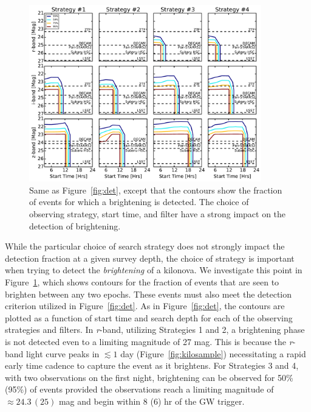 \begin{figure}[t!]
\centering
\includegraphics[width=0.9\textwidth]{./figs/chapter2/ch2_f5.pdf}
\caption{Same as Figure~\ref{fig:det}, except that the contours show the fraction of events for which a brightening is detected. The choice of observing strategy, start time, and filter have a strong impact on the detection of brightening.}
\label{fig:rise}
\end{figure}
   
While the particular choice of search strategy does not strongly impact the detection fraction at a given survey depth, the choice of strategy is important when trying to detect the {\em brightening} of a kilonova. We investigate this point in Figure~\ref{fig:rise}, which shows contours for the fraction of events that are seen to brighten between any two epochs. These events must also meet the detection criterion utilized in Figure~\ref{fig:det}. As in Figure~\ref{fig:det}, the contours are plotted as a function of start time and search depth for each of the observing strategies and filters. In {\em r}-band, utilizing Strategies 1 and 2, a brightening phase is not detected even to a limiting magnitude of 27 mag. This is because the {\em r}-band light curve peaks in $\lesssim 1$ day (Figure~\ref{fig:kilosample}) necessitating a rapid early time cadence to capture the event as it brightens. For Strategies 3 and 4, with two observations on the first night, brightening can be observed for 50\% (95\%) of events provided the observations reach a limiting magnitude of $\approx24.3\,(25)$ mag and begin within 8 (6) hr of the GW trigger.
   
